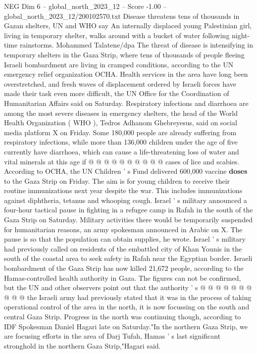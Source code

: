 \begin{textsample}{NEG Dim 6 – global\_north\_2023\_12 – Score -1.00 – global\_north\_2023\_12/200102570.txt}  \label{ex:f6_neg_258}
Disease threatens tens of thousands in Gazan shelters, UN and WHO say An internally displaced young Palestinian girl, living in temporary shelter, walks around with a bucket of water following night-time rainstorms.
Mohammed Talatene/dpa The threat of disease is intensifying in temporary shelters in the Gaza Strip, where tens of thousands of people fleeing Israeli bombardment are living in cramped conditions, according to the UN emergency relief organization OCHA.
Health services in the area have long been overstretched, and fresh waves of displacement ordered by Israeli forces have made their task even more difficult, the UN Office for the Coordination of Humanitarian Affairs said on Saturday.
Respiratory infections and diarrhoea are among the most severe diseases in emergency shelters, the head of the World Health Organization ( WHO ), Tedros Adhanom Ghebreyesus, said on social media platform X on Friday.
Some 180,000 people are already suffering from respiratory infections, while more than 136,000 children under the age of five currently have diarrhoea, which can cause a life-threatening loss of water and vital minerals at this age if @ @ @ @ @ @ @ @ @ @ cases of lice and scabies.
According to OCHA, the UN Children ' s Fund delivered 600,000 vaccine \textbf{doses} to the Gaza Strip on Friday.
The aim is for young children to receive their routine immunizations next year despite the war.
This includes immunizations against diphtheria, tetanus and whooping cough.
Israel ' s military announced a four-hour tactical pause in fighting in a refugee camp in Rafah in the south of the Gaza Strip on Saturday.
Military activities there would be temporarily suspended for humanitarian reasons, an army spokesman announced in Arabic on X.
The pause is so that the population can obtain supplies, he wrote.
Israel ' s military had previously called on residents of the embattled city of Khan Younis in the south of the coastal area to seek safety in Rafah near the Egyptian border.
Israeli bombardment of the Gaza Strip has now killed 21,672 people, according to the Hamas-controlled health authority in Gaza.
The figures can not be confirmed, but the UN and other observers point out that the authority ' s @ @ @ @ @ @ @ @ @ @ the Israeli army had previously stated that it was in the process of taking operational control of the area in the north, it is now focussing on the south and central Gaza Strip.
Progress in the north was continuing though, according to IDF Spokesman Daniel Hagari late on Saturday."In the northern Gaza Strip, we are focusing efforts in the area of Darj Tufah, Hamas ' s last significant stronghold in the northern Gaza Strip,"Hagari said.

\end{textsample}

